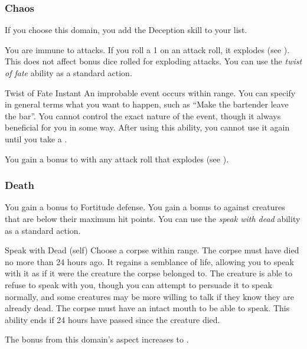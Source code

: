        \subsubsection{Chaos}
            If you choose this domain, you add the Deception skill to your  list.

             You are immune to  attacks.
             If you roll a 1 on an attack roll, it explodes (see ).
            This does not affect bonus dice rolled for exploding attacks.
             You can use the \textit{twist of fate} ability as a standard action.
            \begin{instantability}{Twist of Fate}
                Instant
                \rankline
                An improbable event occurs within \rnglong range.
                You can specify in general terms what you want to happen, such as ``Make the bartender leave the bar''.
                You cannot control the exact nature of the event, though it always beneficial for you in some way.
                After using this ability, you cannot use it again until you take a .
            \end{instantability}
             You gain a  bonus to  with any attack roll that explodes (see ).

        \subsubsection{Death}
             You gain a  bonus to Fortitude defense.
             You gain a  bonus to  against creatures that are below their maximum hit points.
             You can use the \textit{speak with dead} ability as a standard action.
            \begin{attuneability}{Speak with Dead}
                 (self)
                \rankline
                Choose a corpse within \rngshort range.
                The corpse must have died no more than 24 hours ago.
                It regains a semblance of life, allowing you to speak with it as if it were the creature the corpse belonged to.
                The creature is able to refuse to speak with you, though you can attempt to persuade it to speak normally, and some creatures may be more willing to talk if they know they are already dead.
                The corpse must have an intact mouth to be able to speak.
                This ability ends if 24 hours have passed since the creature died.
            \end{attuneability}
             The bonus from this domain's aspect increases to .

